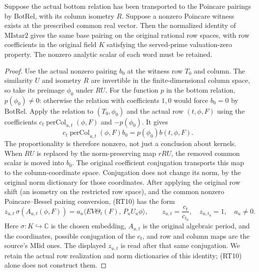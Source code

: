 \begin{lemma}
\label{lem:theta-anchor-arithmetic-descent}
Suppose the actual bottom relation has been transported to the
Poincare pairings by \(\mathrm{BotRel}\), with its column
isometry \(R\). Suppose a nonzero Poincare witness exists at
the prescribed common real vector. Then the normalized identity
of \(\mathrm{MIstar2}\) gives the same base pairing on the original
rational row spaces, with row coefficients in the original field
\(K\) satisfying the served-prime valuation-zero property.
The nonzero analytic scalar of each word must be retained.
\end{lemma}

\begin{proof}
Use the actual nonzero pairing \(b_0\) at the witness row
\(T_0\) and column. The similarity \(U\) and isometry \(R\)
are invertible in the finite-dimensional column space, so take
its preimage \(\phi_0\) under \(RU\).
For the function \(p\) in the bottom relation, \(p(\phi_0)\ne0\):
otherwise the relation with coefficients \(1,0\) would force
\(b_0=0\) by \(\mathrm{BotRel}\).
Apply the relation to \((T_0,\phi_0)\) and the actual row
\((t,\phi,F)\) using the coefficients
\(c_t\operatorname{perCol}_{u,t}(\phi,F)\) and \(-p(\phi_0)\).
It gives
\[
 c_t\operatorname{perCol}_{u,t}(\phi,F)b_0
       =p(\phi_0)b(t,\phi,F).
 \tag{RT10}
\]
The proportionality is therefore nonzero, not just a conclusion
about kernels. When \(RU\) is replaced by the norm-preserving
map \(rRU\), the removed common scalar is moved into \(b_0\).
The original coefficient conjugation transports this map to
the column-coordinate space. Conjugation does not change its
norm, by the original norm dictionary for those coordinates.
After applying the original row shift (an isometry on the
restricted row space), and the common nonzero Poincare--Bessel
pairing conversion, (RT10) has the form
\[
 z_{u,t}\,\sigma(A_{u,t}(\phi,F))
 =a_u\langle E V\Theta_t(F),\,P_u U_u\phi\rangle,\qquad
 z_{u,t}=\frac{c_t}{c_{t_0}},\quad z_{u,t_0}=1,\quad a_u\ne0 .
 \tag{RT11}
\]
Here \(\sigma:K\hookrightarrow\mathbb C\) is the chosen
embedding, \(A_{u,t}\) is the original algebraic period,
and the coordinates, possible conjugation of the \(c_t\), and
row and column maps are the source's
\(\mathrm{MIid}\) ones. The displayed \(z_{u,t}\) is read after
that same conjugation. We retain the actual row realization
and norm dictionaries of this identity; (RT10) alone does not
construct them.


\end{proof}
